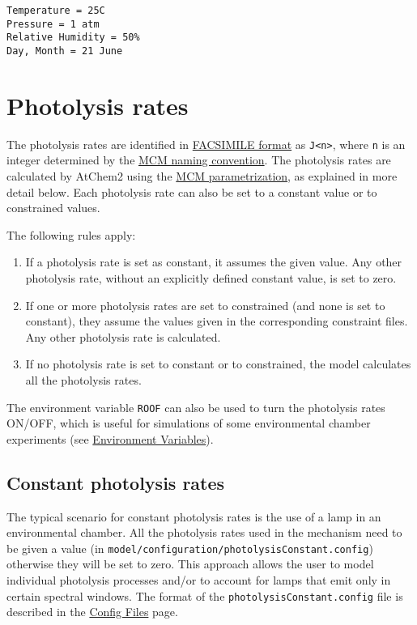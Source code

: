 \begin{verbatim}
Temperature = 25C
Pressure = 1 atm
Relative Humidity = 50%
Day, Month = 21 June
\end{verbatim}

\section{Photolysis rates} \label{sec:photolysis}

The photolysis rates are identified in
\hyperref[sec:mechanism]{FACSIMILE format} as
\texttt{J\textless{}n\textgreater{}}, where \texttt{n} is an integer
determined by the
\href{http://mcm.leeds.ac.uk/MCMv3.3.1/parameters/photolysis.htt}{MCM
  naming convention}. The photolysis rates are calculated by AtChem2
using the
\href{http://mcm.leeds.ac.uk/MCM/parameters/photolysis_param.htt}{MCM
  parametrization}, as explained in more detail below. Each photolysis
rate can also be set to a constant value or to constrained values.

The following rules apply:

\begin{enumerate}
\item If a photolysis rate is set as constant, it assumes the given
  value.  Any other photolysis rate, without an explicitly defined
  constant value, is set to zero.
\item If one or more photolysis rates are set to constrained (and none
  is set to constant), they assume the values given in the
  corresponding constraint files. Any other photolysis rate is
  calculated.
\item If no photolysis rate is set to constant or to constrained, the
  model calculates all the photolysis rates.
\end{enumerate}

The environment variable \texttt{ROOF} can also be used to turn the
photolysis rates ON/OFF, which is useful for simulations of some
environmental chamber experiments (see
\hyperref[sec:envvar]{Environment Variables}).

\subsection{Constant photolysis rates} \label{subsec:constant-photolysis-rates}

The typical scenario for constant photolysis rates is the use of a
lamp in an environmental chamber. All the photolysis rates used in the
mechanism need to be given a value (in
\texttt{model/configuration/photolysisConstant.config}) otherwise they
will be set to zero. This approach allows the user to model individual
photolysis processes and/or to account for lamps that emit only in
certain spectral windows. The format of the
\texttt{photolysisConstant.config} file is described in the
\hyperref[sec:config]{Config Files} page.


